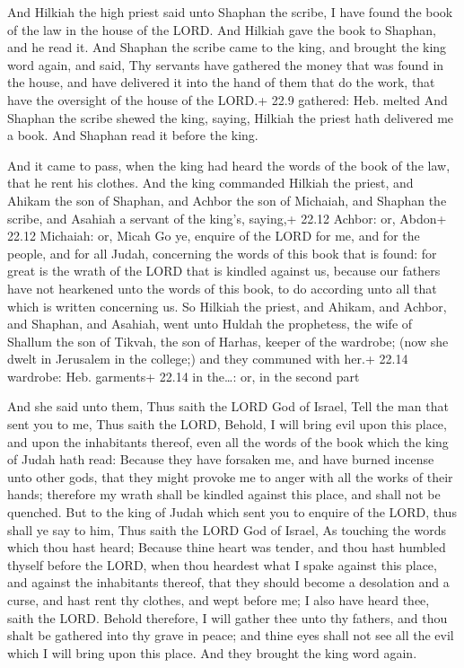  And Hilkiah the high priest said unto Shaphan the scribe,
I have found the book of the law in the house of the LORD. And Hilkiah
gave the book to Shaphan, and he read it.  And Shaphan the
scribe came to the king, and brought the king word again, and said, Thy
servants have gathered the money that was found in the house, and have
delivered it into the hand of them that do the work, that have the
oversight of the house of the LORD.+ 22.9 gathered: Heb. melted
 And Shaphan the scribe shewed the king, saying, Hilkiah
the priest hath delivered me a book. And Shaphan read it before the
king.

 And it came to pass, when the king had heard the words of
the book of the law, that he rent his clothes.  And the
king commanded Hilkiah the priest, and Ahikam the son of Shaphan, and
Achbor the son of Michaiah, and Shaphan the scribe, and Asahiah a
servant of the king's, saying,+ 22.12 Achbor: or, Abdon+ 22.12 Michaiah:
or, Micah  Go ye, enquire of the LORD for me, and for the
people, and for all Judah, concerning the words of this book that is
found: for great is the wrath of the LORD that is kindled against us,
because our fathers have not hearkened unto the words of this book, to
do according unto all that which is written concerning us. 
So Hilkiah the priest, and Ahikam, and Achbor, and Shaphan, and Asahiah,
went unto Huldah the prophetess, the wife of Shallum the son of Tikvah,
the son of Harhas, keeper of the wardrobe; (now she dwelt in Jerusalem
in the college;) and they communed with her.+ 22.14 wardrobe: Heb.
garments+ 22.14 in the\ldots: or, in the second part

 And she said unto them, Thus saith the LORD God of
Israel, Tell the man that sent you to me,  Thus saith the
LORD, Behold, I will bring evil upon this place, and upon the
inhabitants thereof, even all the words of the book which the king of
Judah hath read:  Because they have forsaken me, and have
burned incense unto other gods, that they might provoke me to anger with
all the works of their hands; therefore my wrath shall be kindled
against this place, and shall not be quenched.  But to the
king of Judah which sent you to enquire of the LORD, thus shall ye say
to him, Thus saith the LORD God of Israel, As touching the words which
thou hast heard;  Because thine heart was tender, and thou
hast humbled thyself before the LORD, when thou heardest what I spake
against this place, and against the inhabitants thereof, that they
should become a desolation and a curse, and hast rent thy clothes, and
wept before me; I also have heard thee, saith the LORD. 
Behold therefore, I will gather thee unto thy fathers, and thou shalt be
gathered into thy grave in peace; and thine eyes shall not see all the
evil which I will bring upon this place. And they brought the king word
again.

